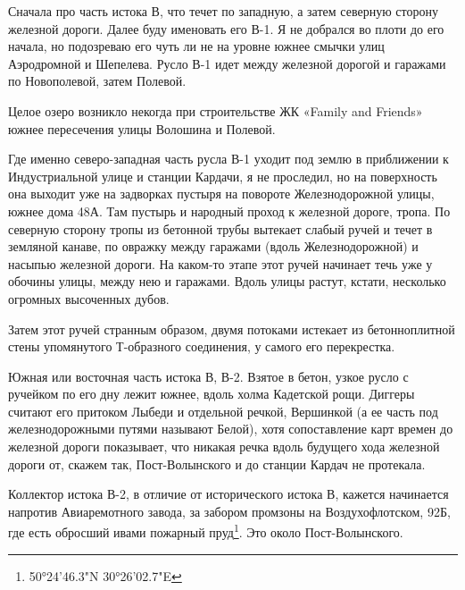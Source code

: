 Сначала про часть истока В, что течет по западную, а затем северную сторону железной дороги. Далее буду именовать его В-1. Я не добрался во плоти до его начала, но подозреваю его чуть ли не на уровне южнее смычки улиц Аэродромной и Шепелева. Русло В-1 идет между железной дорогой и гаражами по Новополевой, затем Полевой. 

Целое озеро возникло некогда при строительстве ЖК «Family and Friends» южнее пересечения улицы Волошина и Полевой.

Где именно северо-западная часть русла В-1 уходит под землю в приближении к Индустриальной улице и станции Кардачи, я не проследил, но на поверхность она выходит уже на задворках пустыря на повороте Железнодорожной улицы, южнее дома 48А. Там пустырь и народный проход к железной дороге, тропа. По северную сторону тропы из бетонной трубы вытекает слабый ручей и течет в земляной канаве, по овражку между гаражами (вдоль Железнодорожной) и насыпью железной дороги. На каком-то этапе этот ручей начинает течь уже у обочины улицы, между нею и гаражами. Вдоль улицы растут, кстати, несколько огромных высоченных дубов.

Затем этот ручей странным образом, двумя потоками истекает из бетонноплитной стены упомянутого Т-образного соединения, у самого его перекрестка.

Южная или восточная часть истока В, В-2.
Взятое в бетон, узкое русло с ручейком по его дну лежит южнее, вдоль холма Кадетской рощи. Диггеры считают его притоком Лыбеди и отдельной речкой, Вершинкой (а ее часть под железнодорожными путями называют Белой), хотя сопоставление карт времен до железной дороги показывает, что никакая речка вдоль будущего хода железной дороги от, скажем так, Пост-Волынского и до станции Кардач не протекала.


Коллектор истока В-2, в отличие от исторического истока В, кажется начинается напротив Авиаремотного завода, за забором промзоны на Воздухофлотском, 92Б, где есть обросший ивами пожарный пруд\footnote{50°24'46.3"N 30°26'02.7"E}. Это около Пост-Волынского.

